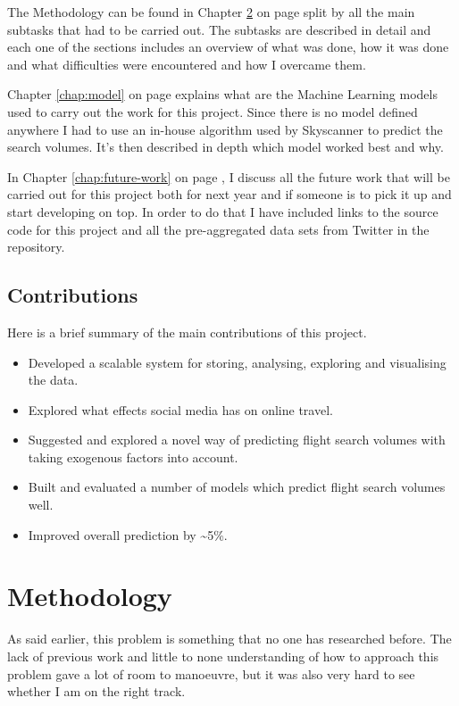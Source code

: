 \documentclass[minf,frontabs,twoside,singlespacing,parskip]{infthesis}
\begin{document}
The Methodology can be found in Chapter \ref{chap:method} on page \pageref{chap:method} split by all the main subtasks that had to be carried out. The subtasks are described in detail and each one of the sections includes an overview of what was done, how it was done and what difficulties were encountered and how I overcame them. 


Chapter \ref{chap:model} on page \pageref{chap:model} explains what are the Machine Learning models used to carry out the work for this project. Since there is no model defined anywhere I had to use an in-house algorithm used by Skyscanner to predict the search volumes. It's then described in depth which model worked best and why. 


In Chapter \ref{chap:future-work} on page \pageref{chap:future-work}, I discuss all the future work that will be carried out for this project both for next year and if someone is to pick it up and start developing on top. In order to do that I have included links to the source code for this project and all the pre-aggregated data sets from Twitter in the repository.

\section{Contributions}

Here is a brief summary of the main contributions of this project.
\begin{itemize}
\item Developed a scalable system for storing, analysing, exploring and visualising the data.
\item Explored what effects social media has on online travel.
\item Suggested and explored a novel way of predicting flight search volumes with taking exogenous factors into account.
\item Built and evaluated a number of models which predict flight search volumes well.
\item Improved overall prediction by \textasciitilde 5\%.
\end{itemize}


\chapter{Methodology}
\label{chap:method}


As said earlier, this problem is something that no one has researched before. The lack of previous work and little to none understanding of how to approach this problem gave a lot of room to manoeuvre, but it was also very hard to see whether I am on the right track.
\end{document}
